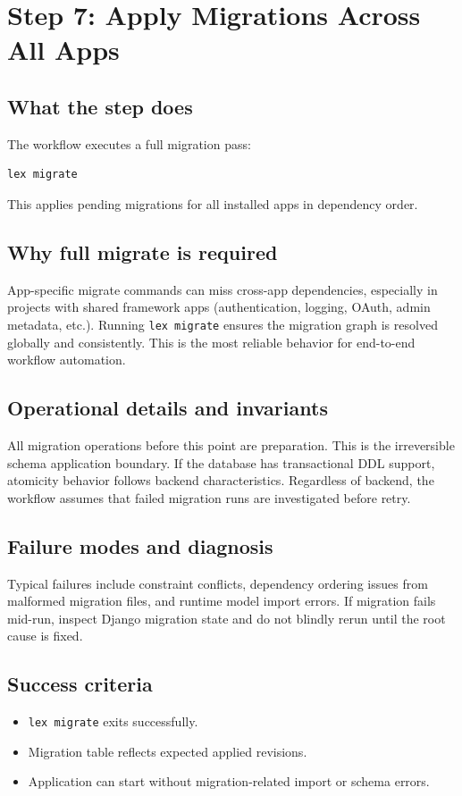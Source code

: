 \documentclass[11pt,a4paper]{article}
\begin{document}
\newpage
\section{Step 7: Apply Migrations Across All Apps}
\subsection*{What the step does}
The workflow executes a full migration pass:
\begin{verbatim}
lex migrate
\end{verbatim}
This applies pending migrations for all installed apps in dependency order.

\subsection*{Why full migrate is required}
App-specific migrate commands can miss cross-app dependencies, especially in projects with
shared framework apps (authentication, logging, OAuth, admin metadata, etc.). Running
\texttt{lex migrate} ensures the migration graph is resolved globally and consistently. This
is the most reliable behavior for end-to-end workflow automation.

\subsection*{Operational details and invariants}
All migration operations before this point are preparation. This is the irreversible schema
application boundary. If the database has transactional DDL support, atomicity behavior
follows backend characteristics. Regardless of backend, the workflow assumes that failed
migration runs are investigated before retry.

\subsection*{Failure modes and diagnosis}
Typical failures include constraint conflicts, dependency ordering issues from malformed
migration files, and runtime model import errors. If migration fails mid-run, inspect Django
migration state and do not blindly rerun until the root cause is fixed.

\subsection*{Success criteria}
\begin{itemize}[leftmargin=1.5em]
  \item \texttt{lex migrate} exits successfully.
  \item Migration table reflects expected applied revisions.
  \item Application can start without migration-related import or schema errors.
\end{itemize}
\end{document}

